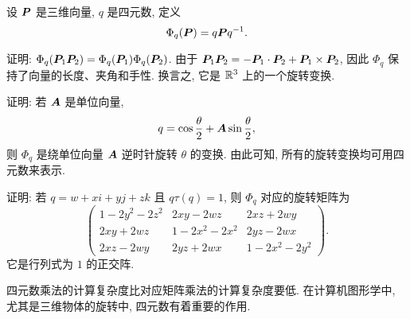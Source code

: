 \begin{subex}
  \item 设 ${\boldsymbol{P}}$ 是三维向量, $q$ 是四元数, 定义
  \[\Phi_q({\boldsymbol{P}})=q{\boldsymbol{P}} q^{-1}.\]
  \begin{subex}
    \item 证明: $\Phi_q({\boldsymbol{P}}_1{\boldsymbol{P}}_2)=\Phi_q({\boldsymbol{P}}_1)\Phi_q({\boldsymbol{P}}_2)$.
    由于 ${\boldsymbol{P}}_1{\boldsymbol{P}}_2=-{\boldsymbol{P}}_1\cdot{\boldsymbol{P}}_2+{\boldsymbol{P}}_1\times{\boldsymbol{P}}_2$, 因此 $\Phi_q$ 保持了向量的长度、夹角和手性. 换言之, 它是 ${\mathbb{R}}^3$ 上的一个旋转变换.
    \item 证明: 若 ${\boldsymbol{A}}$ 是单位向量,
    \[
      q=\cos\dfrac\theta2+{\boldsymbol{A}}\sin\dfrac\theta2,
    \]
    则 $\Phi_q$ 是绕单位向量 ${\boldsymbol{A}}$ 逆时针旋转 $\theta$ 的变换.
    由此可知, 所有的旋转变换均可用四元数来表示.
    \item 证明: 若 $q=w+xi+yj+zk$ 且 $q\tau(q)=1$, 则 $\Phi_q$ 对应的旋转矩阵为
    \[
      \begin{pmatrix}
        1-2y^2-2z^2&2xy-2wz&2xz+2wy\\
        2xy+2wz&1-2x^2-2x^2&2yz-2wx\\
        2xz-2wy&2yz+2wx&1-2x^2-2y^2
      \end{pmatrix}.
    \]
    它是行列式为 $1$ 的正交阵.
  \end{subex}
  四元数乘法的计算复杂度比对应矩阵乘法的计算复杂度要低.
  在计算机图形学中, 尤其是三维物体的旋转中, 四元数有着重要的作用.
\end{subex}



